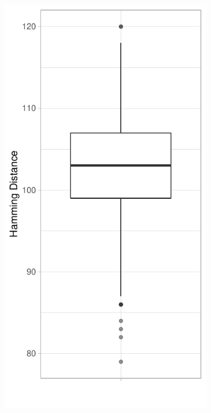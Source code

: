 \documentclass[../../master.tex]{subfiles}
\begin{document}
\begin{figure}[!ht]
	\centering
	\begin{subfigure}[t]{0.2\textwidth}
		\centering
		\includegraphics[width=\textwidth]{pic/results/designs/boxplots/proto-hamming-boxplot.pdf}

\end{subfigure}
\end{figure}
\end{document}
